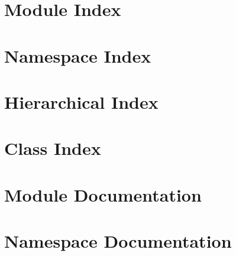 \let\mypdfximage\pdfximage\def\pdfximage{\immediate\mypdfximage}\documentclass[twoside]{book}
\newcommand{\+}{\discretionary{\mbox{\scriptsize$\hookleftarrow$}}{}{}}
\begin{document}
\chapter{Module Index}

\chapter{Namespace Index}

\chapter{Hierarchical Index}

\chapter{Class Index}

\chapter{Module Documentation}































\chapter{Namespace Documentation}



\end{document}

